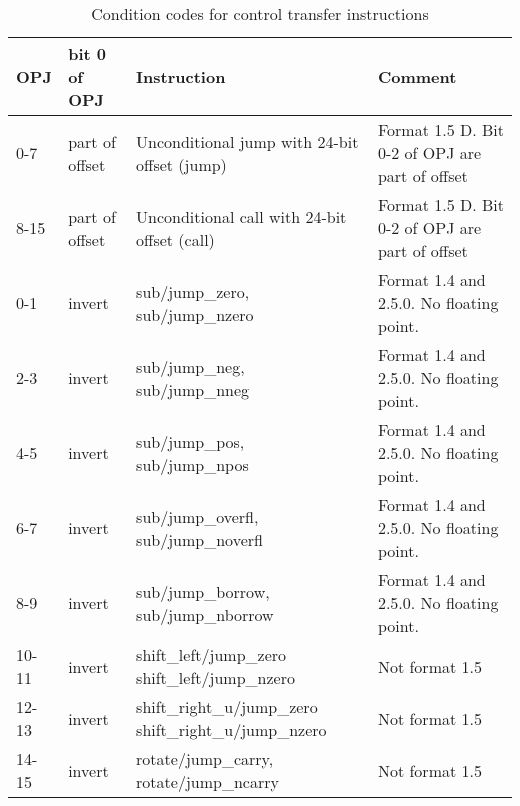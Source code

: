 \documentclass[forwardcom.tex]{subfiles}
\begin{document}
\begin{longtable}
{|p{10mm}|p{14mm}|p{55mm}|p{50mm}|}
\caption{Condition codes for control transfer instructions}
\label{table:controlTransferInstructions}
\endfirsthead
\endhead
\hline
OPJ & bit 0 \newline of OPJ & Instruction & Comment \\
\hline
0-7 & part of offset & Unconditional jump with 24-bit offset (jump) & Format 1.5 D. Bit 0-2 of OPJ are part of offset \\
\hline
8-15 & part of offset & Unconditional call with 24-bit offset (call) & Format 1.5 D.  Bit 0-2 of OPJ are part of offset \\
\hline
0-1 & invert & sub/jump\_zero, \newline sub/jump\_nzero & Format 1.4 and 2.5.0. \newline No floating point. \\
\hline
2-3 & invert & sub/jump\_neg, \newline sub/jump\_nneg & Format 1.4 and 2.5.0. \newline No floating point. \\
\hline
4-5 & invert & sub/jump\_pos, \newline sub/jump\_npos & Format 1.4 and 2.5.0. \newline 
    No floating point. \\
\hline
6-7 & invert & sub/jump\_overfl, \newline sub/jump\_noverfl & Format 1.4 and 2.5.0. \newline No floating point. \\
\hline
8-9 & invert & sub/jump\_borrow, \newline sub/jump\_nborrow & Format 1.4 and 2.5.0. \newline No floating point. \\
\hline
10-11 & invert & shift\_left/jump\_zero \newline shift\_left/jump\_nzero & Not format 1.5 \\
\hline
12-13 & invert & shift\_right\_u/jump\_zero \newline shift\_right\_u/jump\_nzero & Not format 1.5 \\
\hline
14-15 & invert & rotate/jump\_carry, \newline rotate/jump\_ncarry & Not format 1.5 \\
\hline


\end{longtable}
\end{document}
